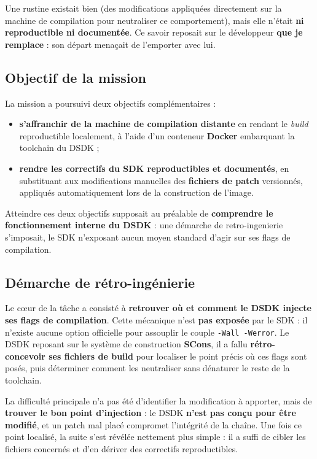 Une rustine existait bien (des modifications appliquées directement sur la
machine de compilation pour neutraliser ce comportement), mais elle n'était
\textbf{ni reproductible ni documentée}. Ce savoir reposait sur le développeur
\textbf{que je remplace} : son départ menaçait de l'emporter avec lui.

\subsection{Objectif de la mission}
La mission a poursuivi deux objectifs complémentaires :
\begin{itemize}
  \item \textbf{s'affranchir de la machine de compilation distante} en rendant
        le \emph{build} reproductible localement, à l'aide d'un conteneur
        \textbf{Docker} embarquant la \gls{toolchain} du DSDK ;
  \item \textbf{rendre les correctifs du SDK reproductibles et documentés}, en
        substituant aux modifications manuelles des \textbf{fichiers de patch}
        versionnés, appliqués automatiquement lors de la construction de
        l'image.
\end{itemize}
Atteindre ces deux objectifs supposait au préalable de \textbf{comprendre le
fonctionnement interne du DSDK} : une démarche de \gls{retro-ingenierie}
s'imposait, le SDK n'exposant aucun moyen standard d'agir sur ses flags de
compilation.

\subsection{Démarche de rétro-ingénierie}
Le cœur de la tâche a consisté à \textbf{retrouver où et comment le DSDK injecte
ses flags de compilation}. Cette mécanique n'est \textbf{pas exposée} par le
SDK : il n'existe aucune option officielle pour assouplir le couple
\texttt{-Wall -Werror}. Le DSDK reposant sur le système de construction
\textbf{SCons}, il a fallu \textbf{rétro-concevoir ses fichiers de build} pour
localiser le point précis où ces flags sont posés, puis déterminer comment les
neutraliser sans dénaturer le reste de la \gls{toolchain}.

La difficulté principale n'a pas été d'identifier la modification à apporter,
mais de \textbf{trouver le bon point d'injection} : le DSDK \textbf{n'est pas
conçu pour être modifié}, et un patch mal placé compromet l'intégrité de la
chaîne. Une fois ce point localisé, la suite s'est révélée nettement plus
simple : il a suffi de cibler les fichiers concernés et d'en dériver des
correctifs reproductibles.

